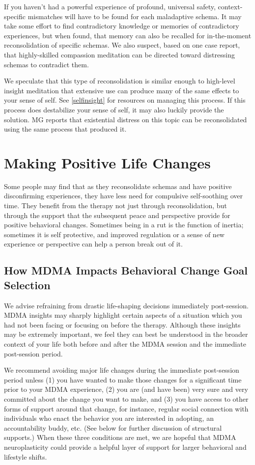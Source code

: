 \documentclass[12pt,letterpaper]{book}
\begin{document}
If you haven't had a powerful experience of profound, universal safety, context-specific mismatches will have to be found for each maladaptive schema.  It may take some effort to find contradictory knowledge or memories of contradictory experiences, but when found, that memory can also be recalled for in-the-moment reconsolidation of specific schemas. We also suspect, based on one case report, that highly-skilled compassion meditation can be directed toward distressing schemas to contradict them.

We speculate that this type of reconsolidation is similar enough to high-level insight meditation that extensive use can produce many of the same effects to your sense of self. See \ref{selfinsight} for resources on managing this process. If this process does destabilize your sense of self, it may also luckily provide the solution. MG reports that existential distress on this topic can be reconsolidated using the same process that produced it.
\section{Making Positive Life Changes}
\label{sec:behavioralchange}
Some people may find that as they reconsolidate schemas and have positive disconfirming experiences, they have less need for compulsive self-soothing over time. They benefit from the therapy not just through reconsolidation, but through the support that the subsequent peace and perspective provide for positive behavioral changes. Sometimes being in a rut is the function of inertia; sometimes it is self protective, and improved regulation or a sense of new experience or perspective can help a person break out of it.

\subsection*{How MDMA Impacts Behavioral Change Goal Selection}

We advise refraining from drastic life-shaping decisions immediately post-session. MDMA insights may sharply highlight certain aspects of a situation which you had not been facing or focusing on before the therapy. Although these insights may be extremely important, we feel they can best be understood in the broader context of your life both before and after the MDMA session and the immediate post-session period.

We recommend avoiding major life changes during the immediate post-session period unless (1) you have wanted to make those changes for a significant time prior to your MDMA experience, (2) you are (and have been) very sure and very committed about the change you want to make, and (3) you have access to other forms of support around that change, for instance, regular social connection with individuals who enact the behavior you are interested in adopting, an accountability buddy, etc. (See below for further discussion of structural supports.) When these three conditions are met, we are hopeful that MDMA neuroplasticity could provide a helpful layer of support for larger behavioral and lifestyle shifts.
\end{document}
